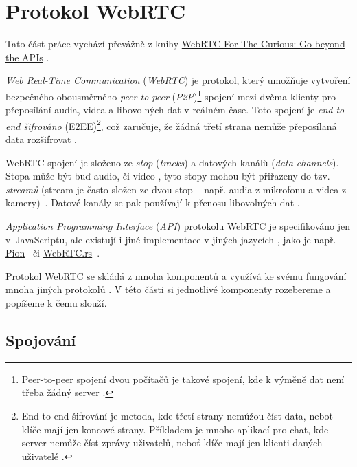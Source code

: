 
\section{Protokol WebRTC}\label{webRTC}

Tato část práce vychází převážně z knihy
\href{https://webrtcforthecurious.com/}{WebRTC For The Curious: Go beyond the
	APIs} \cite{WebRTCForTheCurious}.

\textit{Web Real-Time Communication} (\textit{WebRTC}) je protokol, který
umožňuje vytvoření bezpečného obousměrného \textit{peer-to-peer}
(\textit{P2P})\footnote{Peer-to-peer spojení dvou počítačů je takové spojení,
kde k výměně dat není třeba žádný server \cite{MerriamWebster-PeerToPeer}.}
spojení mezi dvěma klienty pro přeposílání audia, videa a libovolných dat v
reálném čase. Toto spojení je \textit{end-to-end šifrováno}
(E2EE)\footnote{End-to-end šifrování je metoda, kde třetí strany nemůžou číst
data, neboť klíče mají jen koncové strany. Příkladem je mnoho aplikací pro chat,
kde server nemůže číst zprávy uživatelů, neboť klíče mají jen klienti daných
uživatelé \cite{IBM-EndToEndEncryption}.}, což zaručuje, že žádná třetí strana
nemůže přeposílaná data rozšifrovat \cite{WebRTCForTheCurious}.

WebRTC spojení je složeno ze \textit{stop} (\textit{tracks}) a datových kanálů
(\textit{data channels}). Stopa může být buď audio, či video
\cite{MDN-WebRTC-MediaStreamTrack}, tyto stopy mohou být přiřazeny do tzv.
\textit{streamů} (stream je často složen ze dvou stop -- např. audia z mikrofonu
a videa z kamery)~\cite{MDN-WebRTC-MediaStream}. Datové kanály se pak používají
k přenosu libovolných dat \cite{WebRTCORG-GettingStarted-DataChannels}.

\textit{Application Programming Interface} (\textit{API}) protokolu WebRTC je
specifikováno jen v~JavaScriptu, ale existují i jiné implementace v jiných
jazycích \cite{WebRTCForTheCurious}, jako je např. \href{pion/webrtc: Pure Go
implementation of the WebRTC API}{Pion}~\cite{GitHub-Pion-WebRTC} či
\href{https://github.com/webrtc-rs/webrtc}{WebRTC.rs}~\cite{GitHub-WebRTCRS-WebRTC}.

Protokol WebRTC se skládá z mnoha komponentů a využívá ke svému fungování mnoha
jiných protokolů \cite{WebRTCForTheCurious}. V této části si jednotlivé
komponenty rozebereme a popíšeme k čemu slouží.

\subsection{Spojování}\label{connecting}


